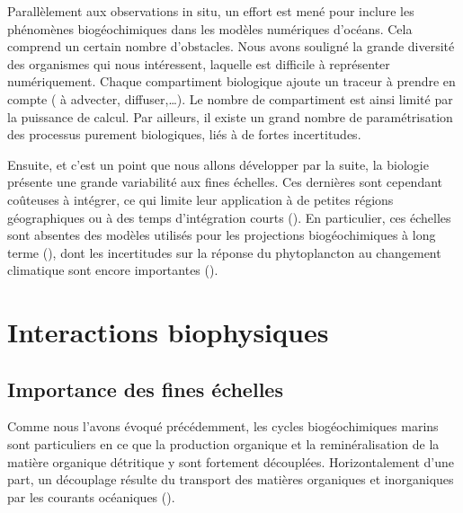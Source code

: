 Parallèlement aux observations in situ, un effort est mené pour inclure les phénomènes biogéochimiques dans les modèles numériques d'océans.
Cela comprend un certain nombre d'obstacles.
Nous avons souligné la grande diversité des organismes qui nous intéressent, laquelle est difficile à représenter numériquement.
Chaque compartiment biologique ajoute un traceur à prendre en compte ( à advecter, diffuser,\dots). Le nombre de compartiment est ainsi limité par la puissance de calcul.
Par ailleurs, il existe un grand nombre de paramétrisation des processus purement biologiques, liés à de fortes incertitudes.

Ensuite, et c'est un point que nous allons développer par la suite, la biologie présente une grande variabilité aux fines échelles.
Ces dernières sont cependant coûteuses à intégrer, ce qui limite leur application à de petites régions géographiques ou à des temps d'intégration courts (\cite{kessouri_2020,hewitt_2022}).
En particulier, ces échelles sont absentes des modèles utilisés pour les projections biogéochimiques à long terme (\cite{bopp_2013}), dont les incertitudes sur la réponse du phytoplancton au changement climatique sont encore importantes (\cite{kwiatkowski_2020}).



\section{Interactions biophysiques}
\label{sec:interactions-biophys}

\subsection{Importance des fines échelles}

Comme nous l'avons évoqué précédemment, les cycles biogéochimiques marins sont particuliers en ce que la production organique et la reminéralisation de la matière organique détritique y sont fortement découplées.
Horizontalement d'une part, un découplage résulte du transport des matières organiques et inorganiques par les courants océaniques (\cite{chabert_2021}).

